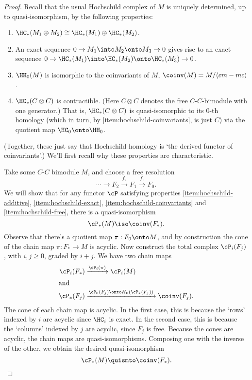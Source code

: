 \begin{proof}
Recall that the usual Hochschild complex of $M$ is uniquely determined,
up to quasi-isomorphism, by the following properties:
\begin{enumerate}
\item \label{item:hochschild-additive}%
$\HC_*(M_1 \oplus M_2) \cong \HC_*(M_1) \oplus \HC_*(M_2)$.
\item \label{item:hochschild-exact}%
An exact sequence $0 \to M_1 \into M_2 \onto M_3 \to 0$ gives rise to an
exact sequence $0 \to \HC_*(M_1) \into \HC_*(M_2) \onto \HC_*(M_3) \to 0$.
\item \label{item:hochschild-coinvariants}%
$\HH_0(M)$ is isomorphic to the coinvariants of $M$, $\coinv(M) =
M/\langle cm-mc \rangle$.
\item \label{item:hochschild-free}%
$\HC_*(C\otimes C)$ is contractible.
(Here $C\otimes C$ denotes
the free $C$-$C$-bimodule with one generator.)
That is, $\HC_*(C\otimes C)$ is
quasi-isomorphic to its $0$-th homology (which in turn, by \ref{item:hochschild-coinvariants}, is just $C$) via the quotient map $\HC_0 \onto \HH_0$.
\end{enumerate}
(Together, these just say that Hochschild homology is `the derived functor of coinvariants'.)
We'll first recall why these properties are characteristic.

Take some $C$-$C$ bimodule $M$, and choose a free resolution
\begin{equation*}
\cdots \to F_2 \xrightarrow{f_2} F_1 \xrightarrow{f_1} F_0.
\end{equation*}
We will show that for any functor $\cP$ satisfying properties
\ref{item:hochschild-additive}, \ref{item:hochschild-exact},
\ref{item:hochschild-coinvariants} and \ref{item:hochschild-free}, there
is a quasi-isomorphism
$$\cP_*(M) \iso \coinv(F_*).$$
%
Observe that there's a quotient map $\pi: F_0 \onto M$, and by
construction the cone of the chain map $\pi: F_* \to M$ is acyclic. Now
construct the total complex $\cP_i(F_j)$, with $i,j \geq 0$, graded by
$i+j$. We have two chain maps
\begin{align*}
\cP_i(F_*) & \xrightarrow{\cP_i(\pi)} \cP_i(M) \\
\intertext{and}
\cP_*(F_j) & \xrightarrow{\cP_0(F_j) \onto H_0(\cP_*(F_j))} \coinv(F_j).
\end{align*}
The cone of each chain map is acyclic. In the first case, this is because the `rows' indexed by $i$ are acyclic since $\HC_i$ is exact.
In the second case, this is because the `columns' indexed by $j$ are acyclic, since $F_j$ is free.
Because the cones are acyclic, the chain maps are quasi-isomorphisms. Composing one with the inverse of the other, we obtain the desired quasi-isomorphism
$$\cP_*(M) \quismto \coinv(F_*).$$


\end{proof}
